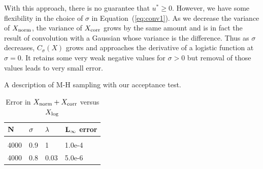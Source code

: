 \documentclass[twoside]{article} \usepackage{aistats2017}
\begin{document}
With this approach, there is no guarantee that $u^* \geq 0$. However, we have
some flexibility in the choice of $\sigma$ in Equation~(\ref{eq:conv1}).
As we decrease the variance of $X_{\rm norm}$, the variance of $X_{\rm corr}$
grows by the same amount and is in fact the result of convolution with a
Gaussian whose variance is the difference.  Thus as $\sigma$ decreases,
$C_\sigma(X)$ grows and approaches the derivative of a logistic function at
$\sigma = 0$. It retains some very weak negative values for $\sigma > 0$ but
removal of those values leads to very small error.

\begin{algorithm}[t]
\caption{A description of M-H sampling with our acceptance test.}
\label{alg:our_algorithm}
\end{algorithm}

\begin{table}[h]
    \caption{Error in $X_{\rm norm}+X_{\rm corr}$ versus $X_{\rm log}$}
    \label{tab:xcorr}
    \centering
    \begin{tabular}{l l l l}
    ${\bf N}$ & ${\bf \sigma}$ & ${\bf \lambda}$ & ${\bf L_{\infty}}$ {\bf error}  \\
    \hline \\
    4000 & 0.9 & 1 & 1.0e-4  \\
    4000 & 0.8 & 0.03 & 5.0e-6 \\
    \end{tabular}
\end{table}
\end{document}
